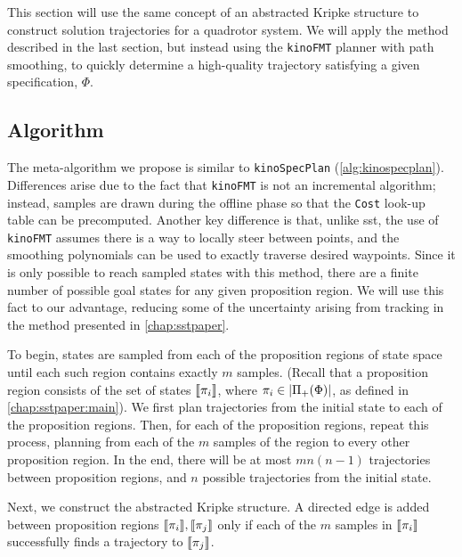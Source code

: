 This section will use the same concept of an abstracted Kripke structure to construct solution trajectories for a quadrotor system. We will apply the method described in the last section, but instead using the \texttt{kinoFMT} planner with path smoothing, to quickly determine a high-quality trajectory satisfying a given \mucalc{} specification, $\Phi$.

\subsection{Algorithm} 

The meta-algorithm we propose is similar to \texttt{kinoSpecPlan} (\autoref{alg:kinospecplan}). Differences arise due to the fact that \texttt{kinoFMT} is not an incremental algorithm; instead, samples are drawn during the offline phase so that the \texttt{Cost} look-up table can be precomputed. Another key difference is that, unlike \gls{sst}, the use of \texttt{kinoFMT} assumes there is a way to locally steer between points, and the smoothing polynomials can be used to exactly traverse desired waypoints. Since it is only possible to reach sampled states with this method, there are a finite number of possible goal states for any given proposition region. We will use this fact to our advantage, reducing some of the uncertainty arising from tracking in the method presented in \autoref{chap:sstpaper}.

To begin, states are sampled from each of the proposition regions of state space until each such region contains exactly $m$ samples. (Recall that a proposition region consists of the set of states ${\llbracket}{} \pi_i {\rrbracket}{}$, where $\pi_i \in \left\lvert\Pi_+(\Phi)\right\rvert$, as defined in \autoref{chap:sstpaper:main}). We first plan trajectories from the initial state to each of the proposition regions. Then, for each of the proposition regions, repeat this process, planning from each of the $m$ samples of the region to every other proposition region. In the end, there will be at most $mn(n-1)$ trajectories between proposition regions, and $n$ possible trajectories from the initial state.

Next, we construct the abstracted Kripke structure. A directed edge is added between proposition regions ${\llbracket}{} \pi_i {\rrbracket}{}, {\llbracket}{} \pi_j {\rrbracket}{}$ only if each of the $m$ samples in ${\llbracket}{} \pi_i {\rrbracket}{}$ successfully finds a trajectory to ${\llbracket}{} \pi_j {\rrbracket}{}$. %

